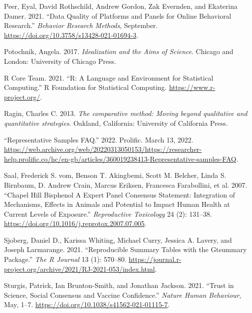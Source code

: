 \documentclass[
  letterpaper,
  DIV=11,
  numbers=noendperiod]{scrartcl}
\newlength{\cslhangindent}
\newlength{\cslentryspacingunit} %
\newenvironment{CSLReferences}[2] %
 {%
  \setlength{\parindent}{0pt}
  \ifodd #1
  \let\oldpar\par
  \def\par{\hangindent=\cslhangindent\oldpar}
  \fi
  \setlength{\parskip}{#2\cslentryspacingunit}
 }%
 {}
\begin{document}
\begin{CSLReferences}{1}{0}
\leavevmode{}%
Peer, Eyal, David Rothschild, Andrew Gordon, Zak Evernden, and Ekaterina
Damer. 2021. {``Data Quality of Platforms and Panels for Online
Behavioral Research.''} \emph{Behavior Research Methods}, September.
\url{https://doi.org/10.3758/s13428-021-01694-3}.

\leavevmode{}%
Potochnik, Angela. 2017. \emph{Idealization and the Aims of Science}.
Chicago and London: University of Chicago Press.

\leavevmode{}%
R Core Team. 2021. {``R: A Language and Environment for Statistical
Computing.''} R Foundation for Statistical Computing.
\url{https://www.r-project.org/}.

\leavevmode{}%
Ragin, Charles C. 2013. \emph{The comparative method: Moving beyond
qualitative and quantitative strategies}. Oakland, California:
University of California Press.

\leavevmode{}%
{``Representative Samples FAQ.''} 2022. Prolific. March 13, 2022.
\url{https://web.archive.org/web/20220313050153/https://researcher-help.prolific.co/hc/en-gb/articles/360019238413-Representative-samples-FAQ}.

\leavevmode{}%
Saal, Frederick S. vom, Benson T. Akingbemi, Scott M. Belcher, Linda S.
Birnbaum, D. Andrew Crain, Marcus Eriksen, Francesca Farabollini, et al.
2007. {``Chapel Hill Bisphenol A Expert Panel Consensus Statement:
Integration of Mechanisms, Effects in Animals and Potential to Impact
Human Health at Current Levels of Exposure.''} \emph{Reproductive
Toxicology} 24 (2): 131--38.
\url{https://doi.org/10.1016/j.reprotox.2007.07.005}.

\leavevmode{}%
Sjoberg, Daniel D., Karissa Whiting, Michael Curry, Jessica A. Lavery,
and Joseph Larmarange. 2021. {``Reproducible Summary Tables with the
Gtsummary Package.''} \emph{The R Journal} 13 (1): 570--80.
\url{https://journal.r-project.org/archive/2021/RJ-2021-053/index.html}.

\leavevmode{}%
Sturgis, Patrick, Ian Brunton-Smith, and Jonathan Jackson. 2021.
{``Trust in Science, Social Consensus and Vaccine Confidence.''}
\emph{Nature Human Behaviour}, May, 1--7.
\url{https://doi.org/10.1038/s41562-021-01115-7}.


\end{CSLReferences}
\end{document}
